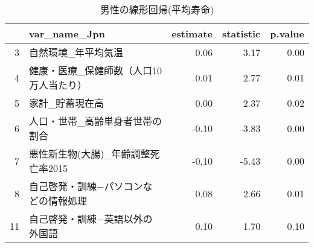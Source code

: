 \begin{table}[H]
\centering
\caption{男性の線形回帰(平均寿命)} 
\label{table_LM_LE_m.tex}
\begingroup\tiny
\begin{adjustbox}{width=1\textwidth}
\begin{tabular}{rlrrr}
  \hline
 & var\_name\_Jpn & estimate & statistic & p.value \\ 
  \hline
  3 & 自然環境\_年平均気温 & 0.06 & 3.17 & 0.00 \\ 
  4 & 健康・医療\_保健師数（人口10万人当たり） & 0.01 & 2.77 & 0.01 \\ 
  5 & 家計\_貯蓄現在高 & 0.00 & 2.37 & 0.02 \\ 
  6 & 人口・世帯\_高齢単身者世帯の割合 & -0.10 & -3.83 & 0.00 \\ 
  7 & 悪性新生物(大腸)\_年齢調整死亡率2015 & -0.10 & -5.43 & 0.00 \\ 
  8 & 自己啓発・訓練−パソコンなどの情報処理 & 0.08 & 2.66 & 0.01 \\ 
  11 & 自己啓発・訓練−英語以外の外国語 & 0.10 & 1.70 & 0.10 \\ 
   \hline
\end{tabular}
\end{adjustbox}
\endgroup
\end{table}

